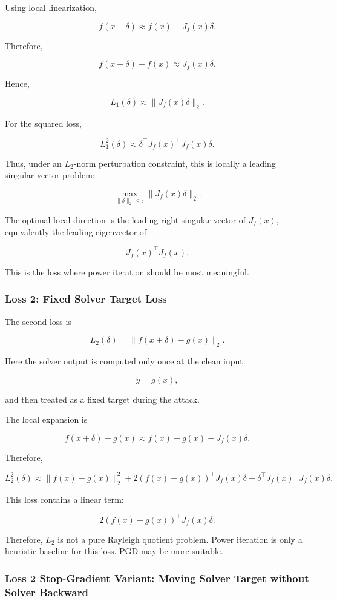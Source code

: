 \documentclass{article}
\begin{document}
Using local linearization,

\[
f(x+\delta)
\approx
f(x)+J_f(x)\delta.
\]

Therefore,

\[
f(x+\delta)-f(x)
\approx
J_f(x)\delta.
\]

Hence,

\[
L_1(\delta)
\approx
\|J_f(x)\delta\|_2.
\]

For the squared loss,

\[
L_1^2(\delta)
\approx
\delta^\top J_f(x)^\top J_f(x)\delta.
\]

Thus, under an \(L_2\)-norm perturbation constraint, this is locally a leading singular-vector problem:

\[
\max_{\|\delta\|_2 \leq \epsilon}
\|J_f(x)\delta\|_2.
\]

The optimal local direction is the leading right singular vector of \(J_f(x)\), equivalently the leading eigenvector of

\[
J_f(x)^\top J_f(x).
\]

This is the loss where power iteration should be most meaningful.

\subsubsection{Loss 2: Fixed Solver Target Loss}

The second loss is

\[
L_2(\delta)
=
\|f(x+\delta)-g(x)\|_2.
\]

Here the solver output is computed only once at the clean input:

\[
y = g(x),
\]

and then treated as a fixed target during the attack.

The local expansion is

\[
f(x+\delta)-g(x)
\approx
f(x)-g(x)+J_f(x)\delta.
\]

Therefore,

\[
L_2^2(\delta)
\approx
\|f(x)-g(x)\|_2^2
+
2(f(x)-g(x))^\top J_f(x)\delta
+
\delta^\top J_f(x)^\top J_f(x)\delta.
\]

This loss contains a linear term:

\[
2(f(x)-g(x))^\top J_f(x)\delta.
\]

Therefore, \(L_2\) is not a pure Rayleigh quotient problem. Power iteration is only a heuristic baseline for this loss. PGD may be more suitable.

\subsubsection{Loss 2 Stop-Gradient Variant: Moving Solver Target without Solver Backward}
\end{document}
